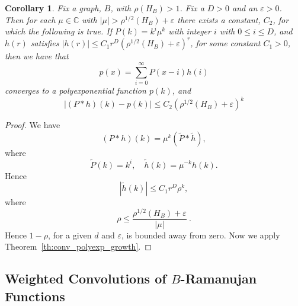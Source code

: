 \documentclass{memo-l}
\theoremstyle{plain}
\theoremstyle{definition}
\numberwithin{section}{chapter}
\numberwithin{equation}{chapter}
\newcommand{\rhoroot}[1]{\rho^{1/2}(H_{#1})}
\theoremstyle{plain}
\newtheorem{cor}[theorem]{Corollary}
\theoremstyle{definition}
\newtheorem{defn}[theorem]{Definition}
\newcommand\CC{\mathbb{C}}
\begin{document}
\begin{cor}\label{cor:polyexponential_conv_error_Ramanujan} Fix a 
graph, $B$, with $\rho(H_B)>1$.
Fix a
\( D>0 \) and an \( \varepsilon>0 \). 
Then for each \( \mu \in \CC
\) with \( |\mu| > \rhoroot B + \varepsilon\) there exists a constant, \(
C_2 \), for which the following is true.  If \( P(k)=k^i \mu^k \) with
integer \( i \) with \( 0\leq i\leq D \), and \( h(r) \) satisfies \(
|h(r)|\leq C_1 r^D (\rhoroot B+\varepsilon)^r \), for some constant \( C_1
> 0 \), then we have that \[ p(x) = \sum_{i=0}^\infty P(x-i) h(i) \]
converges to a polyexponential function \( p(k) \), and \[ |(P * h)(k) -
p(k) | \leq C_2 (\rhoroot B+\varepsilon)^k \] \end{cor} 
\begin{proof} We
have \[ (P * h)(k) = \mu^k (\widetilde P * \widetilde h), \] where \[
\widetilde P(k) = k^i, \quad \widetilde h(k) = \mu^{-k} h(k). \] Hence \[
|\widetilde h(k) | \leq C_1 r^D \rho^k, \] where \[ \rho \leq
\frac{\rhoroot B+\varepsilon}{|\mu|}\ . \] Hence \( 1-\rho \), for a given
\( d \) and \( \varepsilon \), is bounded away from zero.  Now we apply
Theorem~\ref{th:conv_polyexp_growth}.  \end{proof}


%
 
%
%
%
%
\subsection{Weighted Convolutions of $B$-Ramanujan Functions}
\label{sb:Ramanujan}

\end{document}
